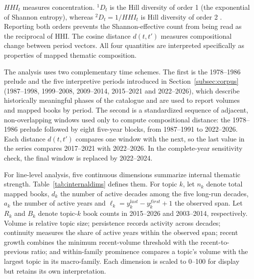 \documentclass[futureinternet,article,submit,moreauthors]{Definitions/mdpi}
\begin{document}
$HHI_t$ measures concentration. ${}^{1}D_t$ is the Hill diversity of order 1 (the exponential of Shannon entropy), whereas ${}^{2}D_t=1/HHI_t$ is Hill diversity of order 2 \citep{shannon1948theory,hill1973diversity}. Reporting both orders prevents the Shannon-effective count from being read as the reciprocal of HHI. The cosine distance $d(t,t')$ measures compositional change between period vectors. All four quantities are interpreted specifically as properties of mapped thematic composition.

The analysis uses two complementary time schemes. The first is the 1978--1986 prelude and the five interpretive periods introduced in Section~\ref{subsec:corpus} (1987--1998, 1999--2008, 2009--2014, 2015--2021 and 2022--2026), which describe historically meaningful phases of the catalogue and are used to report volumes and mapped books by period. The second is a standardized sequence of adjacent, non-overlapping windows used only to compute compositional distance: the 1978--1986 prelude followed by eight five-year blocks, from 1987--1991 to 2022--2026. Each distance $d(t,t')$ compares one window with the next, so the last value in the series compares 2017--2021 with 2022--2026. In the complete-year sensitivity check, the final window is replaced by 2022--2024.

For line-level analysis, five continuous dimensions summarize internal thematic strength. Table~\ref{tab:internaldims} defines them. For topic $k$, let $n_k$ denote total mapped books, $d_k$ the number of active decades among the five long-run decades, $a_k$ the number of active years and $\ell_k=y^{last}_k-y^{first}_k+1$ the observed span. Let $R_k$ and $B_k$ denote topic-$k$ book counts in 2015--2026 and 2003--2014, respectively. Volume is relative topic size; persistence records activity across decades; continuity measures the share of active years within the observed span; recent growth combines the minimum recent-volume threshold with the recent-to-previous ratio; and within-family prominence compares a topic's volume with the largest topic in its macro-family. Each dimension is scaled to 0--100 for display but retains its own interpretation.
\end{document}
